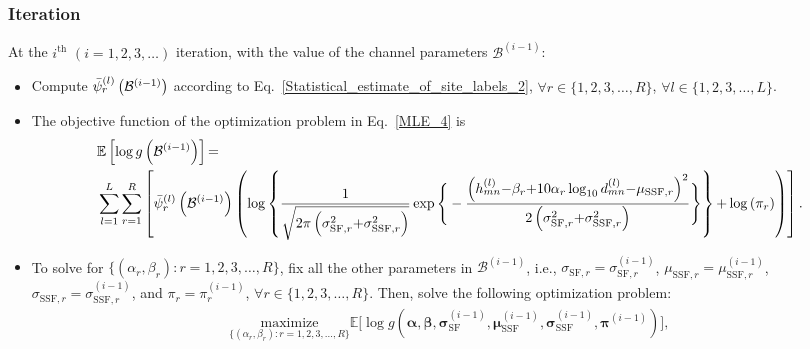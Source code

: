 \documentclass{article}
\begin{document}
\subsubsection{Iteration}
At the $i^{\mathrm{th}}$ $(i{=}1,2,3,{\dots})$ iteration, with the value of the channel parameters $\mathcal{B}^{(i{-}1)}$:
\begin{itemize}
    \item Compute $\Bar{\psi}_{r}^{(l)}\left(\mathcal{B}^{(i{-}1)}\right)$ according to Eq.~\eqref{Statistical_estimate_of_site_labels_2}, ${\forall}r{\in}\{1,2,3,{\dots},R\}$, ${\forall}l{\in}\{1,2,3,{\dots},L\}$.
    \item The objective function of the optimization problem in Eq.~\eqref{MLE_4} is
    \scriptsize{
    \begin{align}\label{Algorithm_objective}
        &\mathbb{E}\left[\log g\left(\mathcal{B}^{(i{-}1)}\right)\right]{=}\\&\sum_{l{=}1}^{L}\sum_{r{=}1}^{R}\left[\Bar{\psi}_{r}^{(l)}\left(\mathcal{B}^{(i{-}1)}\right)\left(\log\left\{\frac{1}{\sqrt{2\pi \left(\sigma_{\mathrm{SF},r}^{2}{+}\sigma_{\mathrm{SSF},r}^{2}\right)}}\exp\Bigg\{-\frac{\left(h_{mn}^{(l)}{-}\beta_{r}{+}10\alpha_{r}\log_{10}d_{mn}^{(l)}{-}\mu_{\mathrm{SSF},r}\right)^{2}}{2\left(\sigma_{\mathrm{SF},r}^{2}{+}\sigma_{\mathrm{SSF},r}^{2}\right)}\Bigg\}\right\}{+}\log\left(\pi_{r}\right)\right)\right]\nonumber.
    \end{align}}\footnotesize
    \item To solve for $\Big\{\left(\alpha_{r},\beta_{r}\right):r{=}1,2,3,{\dots},R\Big\}$, fix all the other parameters in $\mathcal{B}^{(i{-}1)}$, i.e., $\sigma_{\mathrm{SF},r}{=}\sigma_{\mathrm{SF},r}^{(i{-}1)}$, $\mu_{\mathrm{SSF},r}{=}\mu_{\mathrm{SSF},r}^{(i{-}1)}$, $\sigma_{\mathrm{SSF},r}{=}\sigma_{\mathrm{SSF},r}^{(i{-}1)}$, and $\pi_{r}{=}\pi_{r}^{(i{-}1)}$, ${\forall}r{\in}\{1,2,3,{\dots},R\}$. Then, solve the following optimization problem:
    \begin{align}\label{Algorithm_alpha_beta}
        \underset{\Big\{\left(\alpha_{r},\beta_{r}\right):r{=}1,2,3,{\dots},R\Big\}}{\mathrm{maximize}}\mathbb{E}\Bigg[\log g\left(\boldsymbol{\alpha},\boldsymbol{\beta},\boldsymbol{\sigma}_{\mathrm{SF}}^{(i{-}1)},\boldsymbol{\mu}_{\mathrm{SSF}}^{(i{-}1)},\boldsymbol{\sigma}_{\mathrm{SSF}}^{(i{-}1)},\boldsymbol{\pi}^{(i{-}1)}\right)\Bigg],
    \end{align}

\end{itemize}
\end{document}
